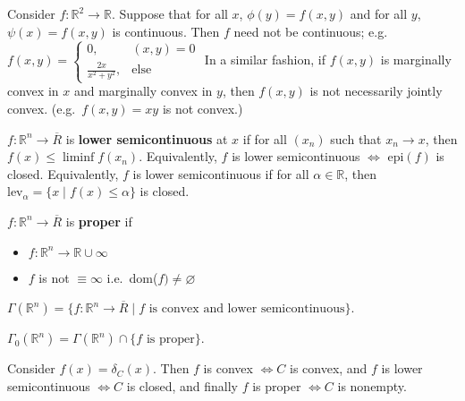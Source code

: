 \documentclass[english, 11pt]{article}
\begin{document}
  \begin{exmp}
  Consider $f: \mathbb{R}^2 \to \mathbb{R}$. Suppose that for all $x$, $\phi(y) = f(x,y)$ and for all $y$, $\psi(x) = f(x,y)$ is continuous. Then $f$ need not be continuous; e.g.\ $f(x,y) = \begin{cases} 0, & (x,y) = 0 \\ \frac{2x}{x^2+y^2}, & \text{else} \end{cases}$ In a similar fashion, if $f(x,y)$ is marginally convex in $x$ and marginally convex in $y$, then $f(x,y)$ is not necessarily jointly convex. (e.g.\ $f(x,y) = xy$ is not convex.)
  \end{exmp}
  
  \begin{defn}
  $f:\mathbb{R}^n \to \overline{R}$ is {\bf lower semicontinuous} at $x$ if for all $(x_n)$ such that $x_n \to x$, then $f(x) \le \liminf f(x_n)$. Equivalently,     $f$ is lower semicontinuous $\iff$ $\text{epi}(f)$ is closed. Equivalently, $f$ is lower semicontinuous if for all $\alpha \in \mathbb{R}$, then $\text{lev}_\alpha = \{x \mid f(x) \le \alpha \} $ is closed.
  \end{defn}
    
  

  
  \begin{defn}[Proper]
   $f:\mathbb{R}^n \to \overline{R}$ is {\bf proper} if 
   \begin{itemize}
   \item $f:\mathbb{R}^n \to \mathbb{R} \cup \infty$
   \item $f$ is not $\equiv \infty$ i.e.\ dom($f) \neq \varnothing$
   \end{itemize}
  \end{defn}
  
    \begin{defn}
  $\Gamma(\mathbb{R}^n)= \{ f : \mathbb{R}^n \to \overline{R} \mid f \text{ is convex and lower semicontinuous} \}$.
  \end{defn}
  
     \begin{defn}
  $\Gamma_0(\mathbb{R}^n)= \Gamma(\mathbb{R}^n) \cap \{ f \text{ is proper}\}$.
  \end{defn}
  
  \begin{exmp}
  Consider $f(x) = \delta_C(x)$. Then $f$ is convex $\iff C$ is convex, and $f$ is lower semicontinuous $\iff C$ is closed, and finally $f$ is proper $\iff C$ is nonempty.
  \end{exmp}
  
\end{document}
